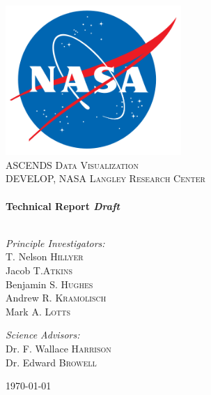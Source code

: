 \begin{titlepage}

\begin{center}

\includegraphics[width=0.5\textwidth]{./resources/logo}\\[1cm]

\textsc{\Huge ASCENDS Data Visualization}\\[1.5cm]

\textsc{\Large DEVELOP, NASA Langley Research Center}\\[0.5cm]

\HRule \\[0.4cm]
{ \huge \bfseries Technical Report \emph{Draft}}\\[0.4cm]

\HRule \\[1.5cm]

\begin{minipage}{0.45\textwidth}
\begin{flushleft} \large
\emph{Principle Investigators:}\\
T. Nelson \textsc{Hillyer}\\
Jacob T.\textsc{Atkins}\\
Benjamin S. \textsc{Hughes}\\
Andrew R. \textsc{Kramolisch}\\
Mark A. \textsc{Lotts}
\end{flushleft}
\end{minipage}
\begin{minipage}{0.45\textwidth}
\begin{flushright} \large
\emph{Science Advisors:}\\
Dr. F. Wallace \textsc{Harrison}\\
Dr. Edward \textsc{Browell}
\end{flushright}
\end{minipage}

\vfill

{\large \today}

\end{center}

\end{titlepage}

